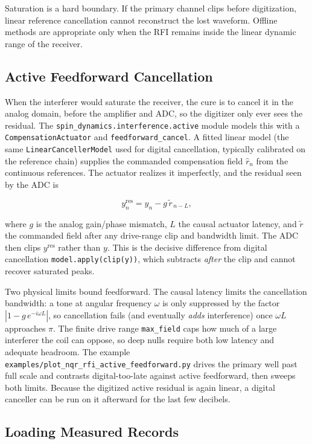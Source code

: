 \documentclass[11pt,oneside]{report}
\newcommand{\code}[1]{\texttt{#1}}
\begin{document}
Saturation is a hard boundary. If the primary channel clips before digitization,
linear reference cancellation cannot reconstruct the lost waveform. Offline
methods are appropriate only when the RFI remains inside the linear dynamic
range of the receiver.

\subsection{Active Feedforward Cancellation}

When the interferer would saturate the receiver, the cure is to cancel it in the
analog domain, before the amplifier and ADC, so the digitizer only ever sees the
residual. The \code{spin\_dynamics.\allowbreak interference.\allowbreak active}
module models this with a \code{CompensationActuator} and \code{feedforward\_cancel}.
A fitted linear model (the same \code{LinearCancellerModel} used for digital
cancellation, typically calibrated on the reference chain) supplies the commanded
compensation field \(\widehat{r}_n\) from the continuous references. The actuator
realizes it imperfectly, and the residual seen by the ADC is

\[
  y^{\mathrm{res}}_n = y_n - g\,\widetilde{r}_{\,n-L},
\]

where \(g\) is the analog gain/phase mismatch, \(L\) the causal actuator latency,
and \(\widetilde{r}\) the commanded field after any drive-range clip and
bandwidth limit. The ADC then clips \(y^{\mathrm{res}}\) rather than \(y\). This
is the decisive difference from digital cancellation \code{model.apply(clip(y))},
which subtracts \emph{after} the clip and cannot recover saturated peaks.

Two physical limits bound feedforward. The causal latency limits the cancellation
bandwidth: a tone at angular frequency \(\omega\) is only suppressed by the factor
\(|1 - g\,e^{-i\omega L}|\), so cancellation fails (and eventually \emph{adds}
interference) once \(\omega L\) approaches \(\pi\). The finite drive range
\code{max\_field} caps how much of a large interferer the coil can oppose, so deep
nulls require both low latency and adequate headroom. The example
\code{examples/plot\_nqr\_rfi\_active\_feedforward.py} drives the primary well past
full scale and contrasts digital-too-late against active feedforward, then sweeps
both limits. Because the digitized active residual is again linear, a digital
canceller can be run on it afterward for the last few decibels.

\subsection{Loading Measured Records}
\end{document}
